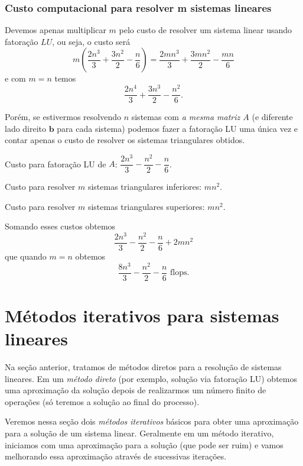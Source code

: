 \documentclass[
	12pt,				%
	oneside,			%
	a4paper,			%
	english,			%
	french,				%
	spanish,			%
	brazil				%
	]{abntex2}
\begin{document}
\subsection{Custo computacional para resolver m sistemas lineares}
Devemos apenas multiplicar $m$ pelo custo de resolver um sistema linear usando fatoração $LU$, ou seja, o custo será
\begin{equation} m(\dfrac{2n^3}{3}+\dfrac{3n^2}{2}-\dfrac{n}{6})=\dfrac{2mn^3}{3}+\dfrac{3mn^2}{2}-\dfrac{mn}{6} \end{equation}
e com $m=n$ temos
\begin{equation} \dfrac{2n^4}{3}+\dfrac{3n^3}{2}-\dfrac{n^2}{6}. \end{equation}

Porém, se estivermos resolvendo $n$ sistemas com \textit{a mesma matriz $A$ }(e diferente lado direito $\pmb b$ para cada sistema) podemos fazer a fatoração LU uma única vez e contar apenas o custo de resolver os sistemas triangulares obtidos.

Custo para fatoração LU de $A$: $\dfrac{2n^3}{3}-\dfrac{n^2}{2}-\dfrac{n}{6}$.

Custo para resolver $m$ sistemas triangulares inferiores: $m n^2 $.

Custo para resolver $m$ sistemas triangulares superiores: $m n^2 $.

Somando esses custos obtemos
\begin{equation} \dfrac{2n^3}{3}-\dfrac{n^2}{2}-\dfrac{n}{6}+2m n^2  \end{equation}
que quando $m=n$ obtemos
\begin{equation} \dfrac{8n^3}{3}-\dfrac{n^2}{2}-\dfrac{n}{6} \text{~flops}. \end{equation}
\newpage

\chapter{Métodos iterativos para sistemas lineares}
Na seção anterior, tratamos de métodos diretos para a resolução de sistemas lineares. Em um \emph{método direto} (por exemplo, solução via fatoração LU) obtemos uma aproximação da solução depois de realizarmos um número finito de operações (só teremos a solução ao final do processo).

Veremos nessa seção dois \emph{métodos iterativos} básicos para obter uma aproximação para a solução de um sistema linear. Geralmente em um método iterativo, iniciamos com uma aproximação para a solução (que pode ser ruim) e vamos melhorando essa aproximação através de sucessivas iterações.
\end{document}
